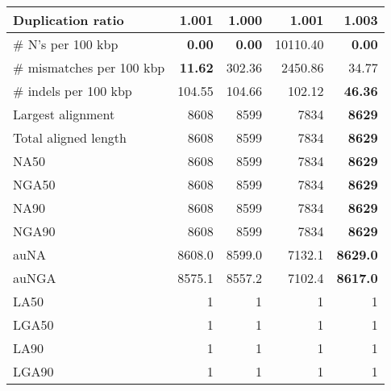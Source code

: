 \documentclass[12pt,a4paper]{article}
\begin{document}
\begin{table}[ht]
\begin{center}
\begin{tabular}{|l*{4}{|r}|}
Duplication ratio & 1.001 & {\bf 1.000} & 1.001 & 1.003 \\ \hline
\# N's per 100 kbp & {\bf 0.00} & {\bf 0.00} & 10110.40 & {\bf 0.00} \\ \hline
\# mismatches per 100 kbp & {\bf 11.62} & 302.36 & 2450.86 & 34.77 \\ \hline
\# indels per 100 kbp & 104.55 & 104.66 & 102.12 & {\bf 46.36} \\ \hline
Largest alignment & 8608 & 8599 & 7834 & {\bf 8629} \\ \hline
Total aligned length & 8608 & 8599 & 7834 & {\bf 8629} \\ \hline
NA50 & 8608 & 8599 & 7834 & {\bf 8629} \\ \hline
NGA50 & 8608 & 8599 & 7834 & {\bf 8629} \\ \hline
NA90 & 8608 & 8599 & 7834 & {\bf 8629} \\ \hline
NGA90 & 8608 & 8599 & 7834 & {\bf 8629} \\ \hline
auNA & 8608.0 & 8599.0 & 7132.1 & {\bf 8629.0} \\ \hline
auNGA & 8575.1 & 8557.2 & 7102.4 & {\bf 8617.0} \\ \hline
LA50 & 1 & 1 & 1 & 1 \\ \hline
LGA50 & 1 & 1 & 1 & 1 \\ \hline
LA90 & 1 & 1 & 1 & 1 \\ \hline
LGA90 & 1 & 1 & 1 & 1 \\ \hline
\end{tabular}
\end{center}
\end{table}
\end{document}
